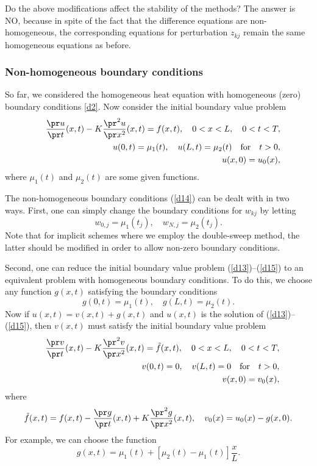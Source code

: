 Do the above modifications affect the stability of the methods? The answer is NO, because
in spite of the fact that the difference equations are non-homogeneous, the corresponding equations for perturbation
$z_{kj}$ remain the same homogeneous equations as before.


  
 
\subsubsection{Non-homogeneous boundary conditions}

So far, we considered the homogeneous heat equation with homogeneous
(zero) boundary conditions \eqref{d2}. Now consider
the initial boundary value problem
\begin{eqnarray}
&&\frac{\pr u}{\pr t}(x,t) - K\frac{\pr^{2} u}{\pr x^{2}}(x,t)=f(x,t), \quad
0<x< L, \quad 0<t<T,   \label{d13} \\
&&u(0,t)=\mu_{1}(t), \quad u(L,t)=\mu_{2}(t) \quad \hbox{for} \quad t>0, \label{d14} \\
&&u(x, 0) = u_{0}(x),   \label{d15}
\end{eqnarray}
where $\mu_{1}(t)$ and $\mu_{2}(t)$ are some given functions.

The non-homogeneous boundary conditions (\ref{d14}) can be
dealt with in two ways. First, one can simply change
the boundary conditions for $w_{kj}$ by letting
\begin{equation}
w_{0,j}=\mu_{1}(t_j), \quad w_{N,j}=\mu_{2}(t_j). \label{d16}
\end{equation}
Note that for implicit schemes where we employ the double-sweep method, the latter should be modified
in order to allow non-zero boundary conditions.
 
Second, one can reduce the initial boundary value problem (\ref{d13})--(\ref{d15}) to an equivalent
problem with homogeneous boundary conditions. To do this, we choose any function
$g(x,t)$ satisfying the boundary conditions
\begin{equation}
g(0,t)=\mu_{1}(t), \quad g(L,t)=\mu_{2}(t). \label{d17}
\end{equation}
Now if $u(x,t)=v(x,t)+g(x,t)$ and $u(x,t)$ is the solution of
(\ref{d13})--(\ref{d15}), then $v(x,t)$ must satisfy the initial boundary value
problem
\begin{eqnarray}
&&\frac{\pr v}{\pr t}(x,t) - K\frac{\pr^{2} v}{\pr x^{2}}(x,t)=\tilde{f}(x,t), \quad
0<x< L, \quad 0<t<T,   \label{d18} \\
&&v(0,t)=0, \quad v(L,t)=0 \quad \hbox{for} \quad t>0, \label{d19} \\
&&v(x, 0) = v_{0}(x),   \label{d20}
\end{eqnarray}
where
\[
\tilde{f}(x,t)=f(x,t)-
\frac{\pr g}{\pr t}(x,t) + K\frac{\pr^{2} g}{\pr x^{2}}(x,t), \quad
v_{0}(x)=u_{0}(x)-g(x,0).
\]
For example, we can choose the function
\[
g(x,t)=\mu_{1}(t)+[\mu_{2}(t)-\mu_{1}(t)]\frac{x}{L}.
\]



